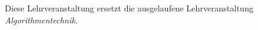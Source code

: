\begin{course}
\begin{content}
\end{content}





\begin{remarks}Diese Lehrveranstaltung ersetzt die ausgelaufene Lehrveranstaltung \emph{Algorithmentechnik}.

\end{remarks}

\end{course}